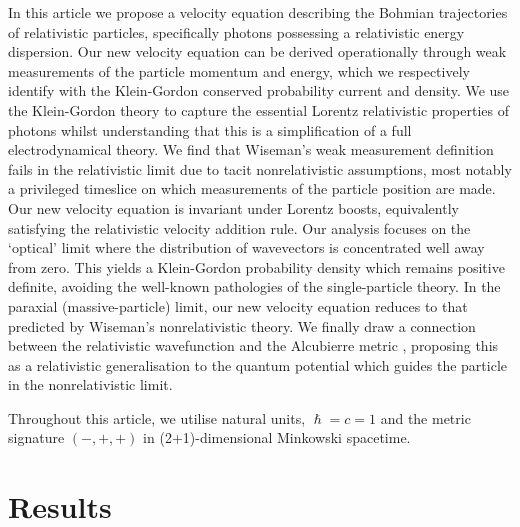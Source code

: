 \documentclass[
prx
,twocolumn
,nofootinbib
,floatfix
,superscriptaddress
]{revtex4-2}
\begin{document}
In this article we propose a velocity equation describing the Bohmian trajectories of relativistic particles, specifically photons possessing a relativistic energy dispersion. Our new velocity equation can be derived operationally through weak measurements of the particle momentum and energy, which we respectively identify with the Klein-Gordon conserved probability current and density.  We use the Klein-Gordon theory to capture the essential Lorentz relativistic properties of photons whilst understanding that this is a simplification of a full electrodynamical theory. We find that Wiseman's weak measurement definition fails in the relativistic limit due to tacit nonrelativistic assumptions, most notably a privileged timeslice on which measurements of the particle position are made. Our new velocity equation is invariant under Lorentz boosts, equivalently satisfying the relativistic velocity addition rule. Our analysis focuses on the `optical' limit where the distribution of wavevectors is concentrated well away from zero.  This yields a Klein-Gordon probability density which remains positive definite, avoiding the well-known pathologies of the single-particle theory. In the paraxial (massive-particle) limit, our new velocity equation reduces to that predicted by Wiseman's nonrelativistic theory. We finally draw a connection between the relativistic wavefunction and the Alcubierre metric \cite{Alcubierre_1994}, proposing this as a relativistic generalisation to the quantum potential \cite{bohmPhysRev.85.166} which guides the particle in the nonrelativistic limit.

Throughout this article, we utilise natural units, $\hslash = c = 1$ and the metric signature $(-,+,+)$ in (2+1)-dimensional Minkowski spacetime. 


\section{Results}
\end{document}
